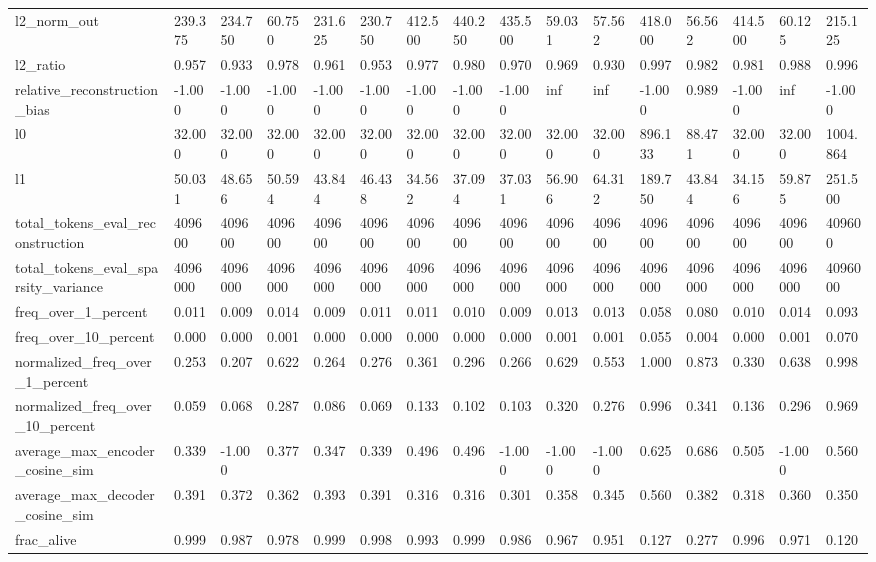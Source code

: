 \begin{table}
\begin{tabular}{llllllllllllllll}
l2_norm_out & 239.375 & 234.750 & 60.750 & 231.625 & 230.750 & 412.500 & 440.250 & 435.500 & 59.031 & 57.562 & 418.000 & 56.562 & 414.500 & 60.125 & 215.125 \\
l2_ratio & 0.957 & 0.933 & 0.978 & 0.961 & 0.953 & 0.977 & 0.980 & 0.970 & 0.969 & 0.930 & 0.997 & 0.982 & 0.981 & 0.988 & 0.996 \\
relative_reconstruction_bias & -1.000 & -1.000 & -1.000 & -1.000 & -1.000 & -1.000 & -1.000 & -1.000 & inf & inf & -1.000 & 0.989 & -1.000 & inf & -1.000 \\
l0 & 32.000 & 32.000 & 32.000 & 32.000 & 32.000 & 32.000 & 32.000 & 32.000 & 32.000 & 32.000 & 896.133 & 88.471 & 32.000 & 32.000 & 1004.864 \\
l1 & 50.031 & 48.656 & 50.594 & 43.844 & 46.438 & 34.562 & 37.094 & 37.031 & 56.906 & 64.312 & 189.750 & 43.844 & 34.156 & 59.875 & 251.500 \\
total_tokens_eval_reconstruction & 409600 & 409600 & 409600 & 409600 & 409600 & 409600 & 409600 & 409600 & 409600 & 409600 & 409600 & 409600 & 409600 & 409600 & 409600 \\
total_tokens_eval_sparsity_variance & 4096000 & 4096000 & 4096000 & 4096000 & 4096000 & 4096000 & 4096000 & 4096000 & 4096000 & 4096000 & 4096000 & 4096000 & 4096000 & 4096000 & 4096000 \\
freq_over_1_percent & 0.011 & 0.009 & 0.014 & 0.009 & 0.011 & 0.011 & 0.010 & 0.009 & 0.013 & 0.013 & 0.058 & 0.080 & 0.010 & 0.014 & 0.093 \\
freq_over_10_percent & 0.000 & 0.000 & 0.001 & 0.000 & 0.000 & 0.000 & 0.000 & 0.000 & 0.001 & 0.001 & 0.055 & 0.004 & 0.000 & 0.001 & 0.070 \\
normalized_freq_over_1_percent & 0.253 & 0.207 & 0.622 & 0.264 & 0.276 & 0.361 & 0.296 & 0.266 & 0.629 & 0.553 & 1.000 & 0.873 & 0.330 & 0.638 & 0.998 \\
normalized_freq_over_10_percent & 0.059 & 0.068 & 0.287 & 0.086 & 0.069 & 0.133 & 0.102 & 0.103 & 0.320 & 0.276 & 0.996 & 0.341 & 0.136 & 0.296 & 0.969 \\
average_max_encoder_cosine_sim & 0.339 & -1.000 & 0.377 & 0.347 & 0.339 & 0.496 & 0.496 & -1.000 & -1.000 & -1.000 & 0.625 & 0.686 & 0.505 & -1.000 & 0.560 \\
average_max_decoder_cosine_sim & 0.391 & 0.372 & 0.362 & 0.393 & 0.391 & 0.316 & 0.316 & 0.301 & 0.358 & 0.345 & 0.560 & 0.382 & 0.318 & 0.360 & 0.350 \\
frac_alive & 0.999 & 0.987 & 0.978 & 0.999 & 0.998 & 0.993 & 0.999 & 0.986 & 0.967 & 0.951 & 0.127 & 0.277 & 0.996 & 0.971 & 0.120 \\
\bottomrule
\end{tabular}
\end{table}
